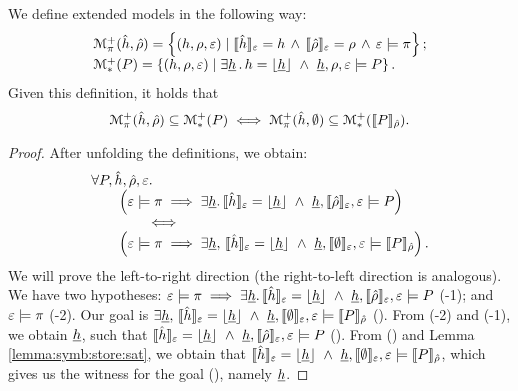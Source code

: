 \begin{lemma}\label{lemma:symb:store:extmod}
We define extended models in the following way: 
$$
\begin{array}{l}
\mathcal{M}_{\pi}^+(\hat{h}, \hat\rho) = \left\{ (h, \rho, \varepsilon) \mid \llbracket \hat{h} \rrbracket_{\varepsilon} = h \, \wedge \, \llbracket \hat\rho \rrbracket_{\varepsilon} = \rho \, \wedge \,  \varepsilon \models \pi  \right\}; \\
\mathcal{M}_{*}^+(P) = \left\{ (h, \rho, \varepsilon) \mid \exists \underline{h} \, . \,  h = \lfloor \underline{h} \rfloor \ \wedge \ \underline{h}, \rho, \varepsilon \models P  \right\}.
\end{array}
$$
Given this definition, it holds that
$$
\mathcal{M}_{\pi}^+(\hat{h}, \hat\rho) \subseteq \mathcal{M}_{*}^+(P) 
    \iff 
    \mathcal{M}_{\pi}^+(\hat{h}, \emptyset) \subseteq \mathcal{M}_{*}^+(\llbracket P \rrbracket_{\hat\rho}).
$$
\end{lemma}

\begin{proof}
After unfolding the definitions, we obtain:
$$\begin{array}{l}
\forall P, \sheap, \sstore, \senv. \\
\qquad \left( \senv \satisfies \pc \implies
\exists \iheap. \,  \semexpr{\sheap}{\senv} = \deabstract{\iheap} \ \wedge \ \iheap, \semexpr{\sstore}{\senv}, \senv \satisfies P \right)
\\
\qquad \qquad \iff \\
\qquad \left( \senv \satisfies \pc \implies
\exists \iheap,\,  \semexpr{\sheap}{\senv} = \deabstract{\iheap} \ \wedge \ \iheap, \semexpr{\emptystore}{\senv}, \senv \satisfies \symbeval{P}{\sstore} \right).
\end{array}$$
We will prove the left-to-right direction (the right-to-left direction is analogous). We have two hypotheses: $\senv \satisfies \pc \implies
\exists \iheap. \,  \semexpr{\sheap}{\senv} = \deabstract{\iheap} \ \wedge \ \iheap, \semexpr{\sstore}{\senv}, \senv \satisfies P$ (\hyp{1}); and $\varepsilon \models \pi$ (\hyp{2}). Our goal is $\exists \underline{h},\,  \llbracket \hat{h} \rrbracket_{\varepsilon} = \lfloor \underline{h} \rfloor \ \wedge \ \underline{h}, \llbracket \emptyset \rrbracket_{\varepsilon}, \varepsilon \models \llbracket P \rrbracket_{\hat\rho}$ (). From (\hyp{2}) and (\hyp{1}), we obtain $\underline{h}$, such that $\semexpr{\sheap}{\senv} = \deabstract{\iheap} \ \wedge \ \iheap, \semexpr{\sstore}{\senv}, \senv \satisfies P$ (). From () and Lemma \ref{lemma:symb:store:sat}, we obtain that $\llbracket \hat{h} \rrbracket_{\varepsilon} = \lfloor \underline{h} \rfloor \ \wedge \ \underline{h}, \llbracket \emptyset \rrbracket_{\varepsilon}, \varepsilon \models \llbracket P \rrbracket_{\hat\rho}$, which gives us the witness for the goal (), namely $\underline{h}$. 
\end{proof}

